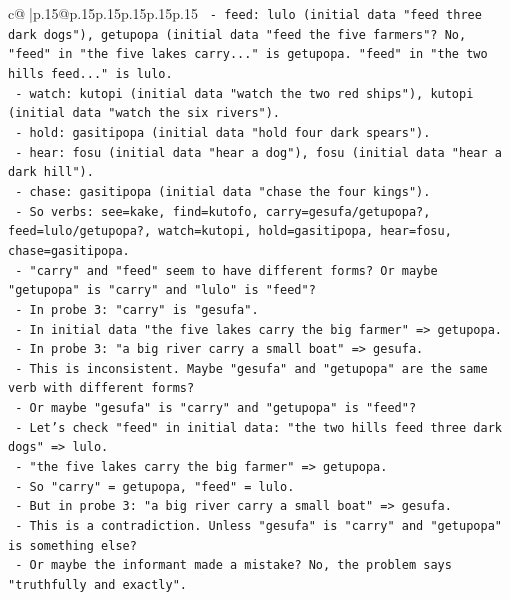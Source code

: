 \documentclass{article}
\begin{document}
{\begin{supertabular}{c@{$\;$}|p{.15\linewidth}@{}p{.15\linewidth}p{.15\linewidth}p{.15\linewidth}p{.15\linewidth}p{.15\linewidth}}
{{{\texttt{         {-} feed: lulo (initial data "feed three dark dogs"), getupopa (initial data "feed the five farmers"? No, "feed" in "the five lakes carry..." is getupopa. "feed" in "the two hills feed..." is lulo.} \\
\texttt{         {-} watch: kutopi (initial data "watch the two red ships"), kutopi (initial data "watch the six rivers").} \\
\texttt{         {-} hold: gasitipopa (initial data "hold four dark spears").} \\
\texttt{         {-} hear: fosu (initial data "hear a dog"), fosu (initial data "hear a dark hill").} \\
\texttt{         {-} chase: gasitipopa (initial data "chase the four kings").} \\
\texttt{         {-} So verbs: see=kake, find=kutofo, carry=gesufa/getupopa?, feed=lulo/getupopa?, watch=kutopi, hold=gasitipopa, hear=fosu, chase=gasitipopa.} \\
\texttt{         {-} "carry" and "feed" seem to have different forms? Or maybe "getupopa" is "carry" and "lulo" is "feed"?} \\
\texttt{         {-} In probe 3: "carry" is "gesufa".} \\
\texttt{         {-} In initial data "the five lakes carry the big farmer" => getupopa.} \\
\texttt{         {-} In probe 3: "a big river carry a small boat" => gesufa.} \\
\texttt{         {-} This is inconsistent. Maybe "gesufa" and "getupopa" are the same verb with different forms?} \\
\texttt{         {-} Or maybe "gesufa" is "carry" and "getupopa" is "feed"?} \\
\texttt{         {-} Let's check "feed" in initial data: "the two hills feed three dark dogs" => lulo.} \\
\texttt{         {-} "the five lakes carry the big farmer" => getupopa.} \\
\texttt{         {-} So "carry" = getupopa, "feed" = lulo.} \\
\texttt{         {-} But in probe 3: "a big river carry a small boat" => gesufa.} \\
\texttt{         {-} This is a contradiction. Unless "gesufa" is "carry" and "getupopa" is something else?} \\
\texttt{         {-} Or maybe the informant made a mistake? No, the problem says "truthfully and exactly".} \\
}}}
\end{supertabular}}
\end{document}
